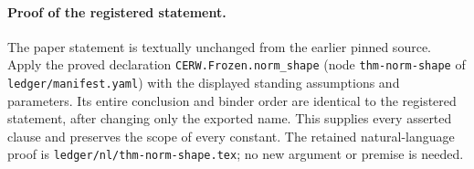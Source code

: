 \paragraph{Proof of the registered statement.}
The paper statement is textually unchanged from the earlier pinned source.
Apply the proved declaration \texttt{CERW.Frozen.norm\_shape}
(node \texttt{thm-norm-shape} of \texttt{ledger/manifest.yaml}) with the displayed
standing assumptions and parameters. Its entire conclusion and binder order
are identical to the registered statement, after changing only the exported
name. This supplies every asserted clause and preserves the scope of every
constant. The retained natural-language proof is
\texttt{ledger/nl/thm-norm-shape.tex}; no new argument or premise is needed.
